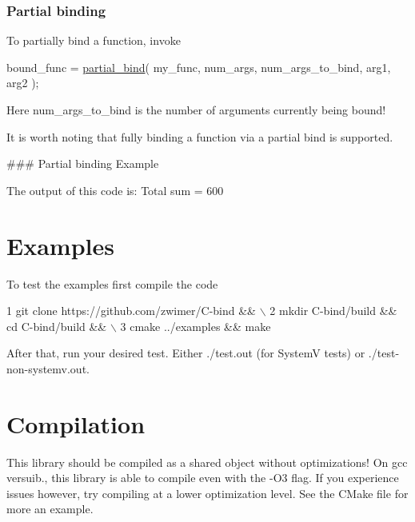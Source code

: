 \subsubsection*{Partial binding}

To partially bind a function, invoke 
\begin{DoxyCode}
bound\_func = \hyperlink{bind_8c_a187e674be73b611c4e8d97345192757a}{partial\_bind}( my\_func, num\_args, num\_args\_to\_bind, arg1, arg2 );
\end{DoxyCode}
 Here {\ttfamily num\+\_\+args\+\_\+to\+\_\+bind} is the number of arguments currently being bound!

It is worth noting that fully binding a function via a partial bind is supported.

\#\#\# Partial binding Example 
 The output of this code is\+: {\ttfamily Total sum = 600} 



\section*{Examples}

To test the examples first compile the code 
\begin{DoxyCode}
1 git clone https://github.com/zwimer/C-bind && \(\backslash\)
2 mkdir C-bind/build && cd C-bind/build && \(\backslash\)
3 cmake ../examples && make
\end{DoxyCode}


After that, run your desired test. Either {\ttfamily ./test.out} (for SystemV tests) or {\ttfamily ./test-\/non-\/systemv.out}.

\section*{Compilation}

This library should be compiled as a shared object without optimizations! On {\ttfamily gcc} versuib{.}, this library is able to compile even with the {\ttfamily -\/\+O3} flag. If you experience issues however, try compiling at a lower optimization level. See the {\ttfamily C\+Make} file for more an example.

